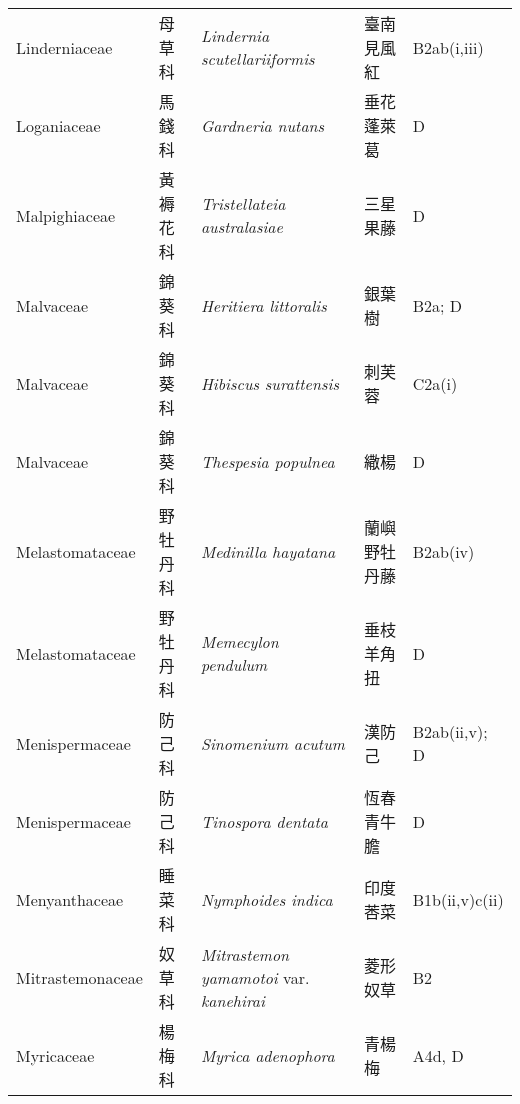 {\begin{longtable}{p{2.5cm}p{2.5cm}p{4.5cm}p{2.5cm}p{3cm}}
    Linderniaceae & 母草科 & \textit{Lindernia scutellariiformis}  & 臺南見風紅 & B2ab(i,iii) \index{Lindernia@\textit{Lindernia}!scutellariiformis@\textit{scutellariiformis}}  \index{臺南見風紅} \\
    Loganiaceae & 馬錢科 & \textit{Gardneria nutans}  & 垂花蓬萊葛 & D \index{Gardneria@\textit{Gardneria}!nutans@\textit{nutans}}  \index{垂花蓬萊葛} \\
    Malpighiaceae & 黃褥花科 & \textit{Tristellateia australasiae}  & 三星果藤 & D \index{Tristellateia@\textit{Tristellateia}!australasiae@\textit{australasiae}}  \index{三星果藤} \\
    Malvaceae & 錦葵科 & \textit{Heritiera littoralis}  & 銀葉樹 & B2a; D \index{Heritiera@\textit{Heritiera}!littoralis@\textit{littoralis}}  \index{銀葉樹} \\
    Malvaceae & 錦葵科 & \textit{Hibiscus surattensis}  & 刺芙蓉 & C2a(i) \index{Hibiscus@\textit{Hibiscus}!surattensis@\textit{surattensis}}  \index{刺芙蓉} \\
    Malvaceae & 錦葵科 & \textit{Thespesia populnea}  & 繖楊 & D \index{Thespesia@\textit{Thespesia}!populnea@\textit{populnea}}  \index{繖楊} \\
    Melastomataceae & 野牡丹科 & \textit{Medinilla hayatana}  & 蘭嶼野牡丹藤 & B2ab(iv) \index{Medinilla@\textit{Medinilla}!hayatana@\textit{hayatana}}  \index{蘭嶼野牡丹藤} \\
    Melastomataceae & 野牡丹科 & \textit{Memecylon pendulum}  & 垂枝羊角扭 & D \index{Memecylon@\textit{Memecylon}!pendulum@\textit{pendulum}}  \index{垂枝羊角扭} \\
    Menispermaceae & 防己科 & \textit{Sinomenium acutum}  & 漢防己 & B2ab(ii,v); D \index{Sinomenium@\textit{Sinomenium}!acutum@\textit{acutum}}  \index{漢防己} \\
    Menispermaceae & 防己科 & \textit{Tinospora dentata}  & 恆春青牛膽 & D \index{Tinospora@\textit{Tinospora}!dentata@\textit{dentata}}  \index{恆春青牛膽} \\
    Menyanthaceae & 睡菜科 & \textit{Nymphoides indica}  & 印度莕菜 & B1b(ii,v)c(ii) \index{Nymphoides@\textit{Nymphoides}!indica@\textit{indica}}  \index{印度莕菜} \\
    Mitrastemonaceae & 奴草科 & \textit{Mitrastemon yamamotoi} var. \textit{kanehirai}  & 菱形奴草 & B2 \index{Mitrastemon@\textit{Mitrastemon}!yamamotoi@\textit{yamamotoi}!var. kanehirai@var. \textit{kanehirai}}  \index{菱形奴草} \\
    Myricaceae & 楊梅科 & \textit{Myrica adenophora}  & 青楊梅 & A4d, D \index{Myrica@\textit{Myrica}!adenophora@\textit{adenophora}}  \index{青楊梅} \\

\end{longtable}}
